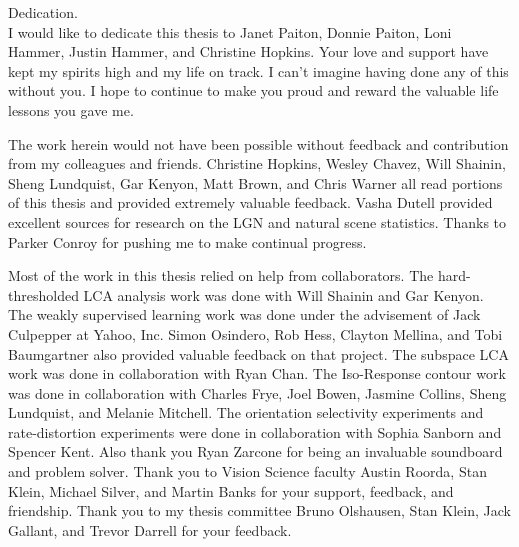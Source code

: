 \documentclass{ucbthesis}
\begin{document}
\begin{frontmatter}

\begin{dedication}
\null\vfil
\begin{center}
Dedication.\\\vspace{12pt}
I would like to dedicate this thesis to Janet Paiton, Donnie Paiton, Loni Hammer, Justin Hammer, and Christine Hopkins. Your love and support have kept my spirits high and my life on track. I can't imagine having done any of this without you. I hope to continue to make you proud and reward the valuable life lessons you gave me.
\end{center}
\vfil\null
\end{dedication}


\tableofcontents
\clearpage
\listoffigures
\listoftables

\begin{acknowledgements}
The work herein would not have been possible without feedback and contribution from my colleagues and friends. Christine Hopkins, Wesley Chavez, Will Shainin, Sheng Lundquist, Gar Kenyon, Matt Brown, and Chris Warner all read portions of this thesis and provided extremely valuable feedback. Vasha Dutell provided excellent sources for research on the LGN and natural scene statistics. Thanks to Parker Conroy for pushing me to make continual progress.

Most of the work in this thesis relied on help from collaborators. The hard-thresholded LCA analysis work was done with Will Shainin and Gar Kenyon. The weakly supervised learning work was done under the advisement of Jack Culpepper at Yahoo, Inc. Simon Osindero, Rob Hess, Clayton Mellina, and Tobi Baumgartner also provided valuable feedback on that project. The subspace LCA work was done in collaboration with Ryan Chan. The Iso-Response contour work was done in collaboration with Charles Frye, Joel Bowen, Jasmine Collins, Sheng Lundquist, and Melanie Mitchell. The orientation selectivity experiments and rate-distortion experiments were done in collaboration with Sophia Sanborn and Spencer Kent. Also thank you Ryan Zarcone for being an invaluable soundboard and problem solver. Thank you to Vision Science faculty Austin Roorda, Stan Klein, Michael Silver, and Martin Banks for your support, feedback, and friendship. Thank you to my thesis committee Bruno Olshausen, Stan Klein, Jack Gallant, and Trevor Darrell for your feedback.


\end{acknowledgements}
\end{frontmatter}
\end{document}
